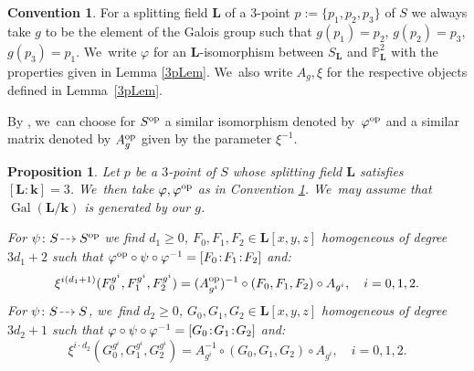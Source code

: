 \documentclass[JEP,XML,SOM,Unicode,NoFloatCountersInSection, NoEqCountersInSection,published]{cedram}
\newcommand{\dradpl}{{\hspace*{-2mm}\begin{tikzcd}[ampersand replacement=\&,column sep = scriptsize]\mbox{}\ar[r,dashed]\&\mbox{}\end{tikzcd}\hspace*{-2mm}}}
\newcommand{\dratst}{{\hspace*{-2.5mm}\begin{tikzcd}[ampersand replacement=\&,column sep = small]\mbox{}\ar[r,dashed]\&\mbox{}\end{tikzcd}\hspace*{-2mm}}}
\let\drascst\dratst
\newcommand{\dra}{\mathchoice{\dradpl}{\dratst}{\drascst}{\drascst}}
\newcommand{\op}{\textup{op}}
\newcommand{\sep}{\mkern2mu{:}\mkern2mu}
\DeclareMathOperator{\Gal}{Gal}
\newtheorem{proposition}[theorem]{Proposition}
\theoremstyle{definition}
\newtheorem{convention}[theorem]{Convention}
\newcommand{\kk}{{\boldsymbol{k}}}
\newcommand{\LL}{{\boldsymbol{L}}}
\begin{document}
\begin{convention} \label{conv: phi}
For a splitting field $\LL$ of a $3$\nobreakdash-point $p := \{ p_1, p_2, p_3\}$ of $S$ we always take $g$ to be the element of the Galois group such that $g(p_1) = p_2$, $g(p_2) = p_3$, $g(p_3) = p_1$. We~write $\varphi$ for an $\LL$-isomorphism between $S_{\LL}$ and $\mathbb{P}^2_\LL$ with the properties given in Lemma \ref{3pLem}. We~also write $A_g, \xi$ for the respective objects defined in Lem\-ma~\ref{3pLem}.

By \cite[Lem.\,3.2.9]{BSY}, we~can choose for $S^{\op}$ a similar isomorphism denoted by~$\varphi^{\op}$ and a similar matrix denoted by $A_{g}^{\op}$ given by the parameter $\xi^{-1}$.
\end{convention}

\begin{proposition} \label{AffineRep}
Let $p$ be a $3$\nobreakdash-point of $S$ whose splitting field $\LL$ satisfies \hbox{$[\LL:\kk]=3$}. We~then take $\varphi, \varphi^{\op}$ as in Convention \ref{conv: phi}. We~may assume that $\Gal({\LL/\kk})$ is generated by our $g$.

For $\psi \colon S \dra S^{\op}$ we find $d_1 \geq 0$, $F_0,F_1,F_2 \in \LL[x,y,z]$ homogeneous of degree $3d_1 + 2$ such that $\varphi^{\op} \circ \psi \circ \varphi^{-1} = [F_0\sep F_1\sep F_2]$ and:
\begin{equation} \label{eq:RepB}
\xi^{i(d_1+1)} (F_0^{g^i}, F_1^{g^i}, F_2^{g^i}) = (A_{g^i}^{\op})^{-1} \circ (F_0,F_1,F_2) \circ A_{g^i}, \quad i=0,1,2.
\end{equation}
For $\psi \colon S \dra S$, we~find $d_2 \geq 0$, $G_0,G_1,G_2 \in \LL[x,y,z]$ homogeneous of degree $3d_2 + 1$ such that $\varphi \circ \psi \circ \varphi^{-1} = [G_0\sep G_1\sep G_2]$ and:
\begin{equation}
\label{eq:RepB2} \xi^{i\cdot d_2} (G_0^{g^i}, G_1^{g^i}, G_2^{g^i}) = A_{g^i}^{-1} \circ (G_0,G_1,G_2) \circ A_{g^i}, \quad i=0,1,2.
\end{equation}
\end{proposition}
\end{document}
